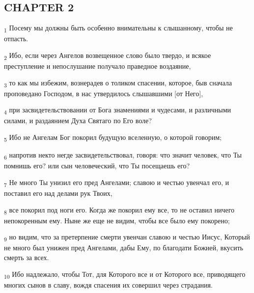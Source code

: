 \subsection{CHAPTER 2}
\begin{tcolorbox}
\textsubscript{1} Посему мы должны быть особенно внимательны к слышанному, чтобы не отпасть.
\end{tcolorbox}
\begin{tcolorbox}
\textsubscript{2} Ибо, если через Ангелов возвещенное слово было твердо, и всякое преступление и непослушание получало праведное воздаяние,
\end{tcolorbox}
\begin{tcolorbox}
\textsubscript{3} то как мы избежим, вознерадев о толиком спасении, которое, быв сначала проповедано Господом, в нас утвердилось слышавшими [от Него],
\end{tcolorbox}
\begin{tcolorbox}
\textsubscript{4} при засвидетельствовании от Бога знамениями и чудесами, и различными силами, и раздаянием Духа Святаго по Его воле?
\end{tcolorbox}
\begin{tcolorbox}
\textsubscript{5} Ибо не Ангелам Бог покорил будущую вселенную, о которой говорим;
\end{tcolorbox}
\begin{tcolorbox}
\textsubscript{6} напротив некто негде засвидетельствовал, говоря: что значит человек, что Ты помнишь его? или сын человеческий, что Ты посещаешь его?
\end{tcolorbox}
\begin{tcolorbox}
\textsubscript{7} Не много Ты унизил его пред Ангелами; славою и честью увенчал его, и поставил его над делами рук Твоих,
\end{tcolorbox}
\begin{tcolorbox}
\textsubscript{8} все покорил под ноги его. Когда же покорил ему все, то не оставил ничего непокоренным ему. Ныне же еще не видим, чтобы все было ему покорено;
\end{tcolorbox}
\begin{tcolorbox}
\textsubscript{9} но видим, что за претерпение смерти увенчан славою и честью Иисус, Который не много был унижен пред Ангелами, дабы Ему, по благодати Божией, вкусить смерть за всех.
\end{tcolorbox}
\begin{tcolorbox}
\textsubscript{10} Ибо надлежало, чтобы Тот, для Которого все и от Которого все, приводящего многих сынов в славу, вождя спасения их совершил через страдания.
\end{tcolorbox}
